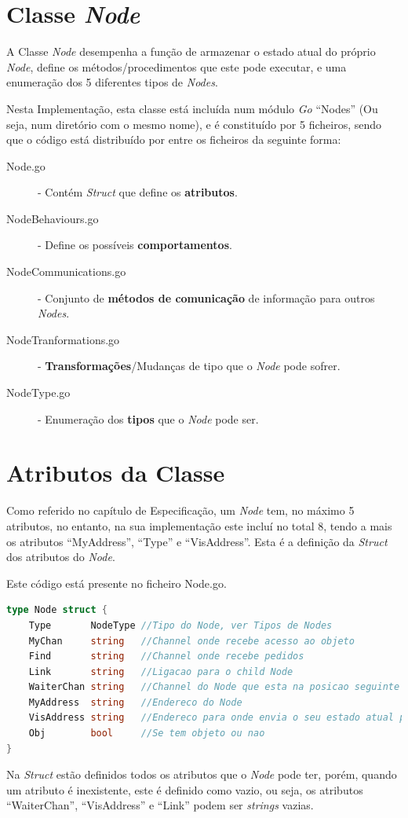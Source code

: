 \section{Classe \emph{Node}}
A Classe \emph{Node} desempenha a função de armazenar o estado atual do próprio \emph{Node}, define os métodos/procedimentos que este pode executar, e uma enumeração dos 5 diferentes tipos de \emph{Nodes}.



Nesta Implementação, esta classe está incluída num módulo \emph{Go} ``Nodes'' (Ou seja, num diretório com o mesmo nome), e é constituído por 5 ficheiros, sendo que o código está distribuído por entre os ficheiros da seguinte forma:

\begin{description}
    \item [Node.go] - Contém \emph{Struct} que define os \textbf{atributos}.
    \item [NodeBehaviours.go] - Define os possíveis \textbf{comportamentos}.
    \item [NodeCommunications.go] - Conjunto de \textbf{métodos de comunicação} de informação para outros \emph{Nodes}.
    \item [NodeTranformations.go] - \textbf{Transformações}/Mudanças de tipo que o \emph{Node} pode sofrer.
    \item [NodeType.go] - Enumeração dos \textbf{tipos} que o \emph{Node} pode ser.
\end{description} 


\section{Atributos da Classe}
Como referido no capítulo de Especificação, um \emph{Node} tem, no máximo 5 atributos, no entanto, na sua implementação este incluí no total 8, tendo a mais os atributos ``MyAddress'', ``Type'' e ``VisAddress''.
Esta é a definição da \emph{Struct} dos atributos do \emph{Node}.


Este código está presente no ficheiro Node.go.


\begin{lstlisting}[caption={Definição da estrutura \emph{Node}},language=Go]
type Node struct {
	Type       NodeType //Tipo do Node, ver Tipos de Nodes
	MyChan     string   //Channel onde recebe acesso ao objeto
	Find       string   //Channel onde recebe pedidos
	Link       string   //Ligacao para o child Node
	WaiterChan string   //Channel do Node que esta na posicao seguinte da fila
	MyAddress  string   //Endereco do Node
	VisAddress string   //Endereco para onde envia o seu estado atual para a atualizacao da visualizacao
	Obj        bool     //Se tem objeto ou nao 
}

\end{lstlisting}
Na \emph{Struct} estão definidos todos os atributos que o \emph{Node} pode ter, porém, quando um atributo é inexistente, este é definido como vazio, ou seja, os atributos ``WaiterChan'', ``VisAddress'' e ``Link'' podem ser \emph{strings} vazias.

